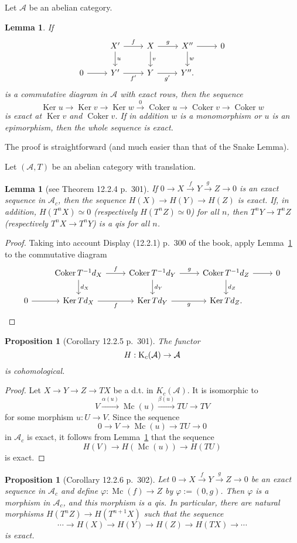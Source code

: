 \documentclass[12pt]{article}%
\newtheorem{lem}[thm]{Lemma}
\newtheorem{prop}[thm]{Proposition}
\theoremstyle{remark}
\theoremstyle{definition}
\newcommand{\A}{\mathcal A}
\newcommand{\pp}{\varphi}
\newcommand{\xr}{\xrightarrow}
\DeclareMathOperator{\Coker}{Coker}
\DeclareMathOperator{\Ker}{Ker}
\DeclareMathOperator{\Mc}{Mc}
\begin{document}
Let $\A$ be an abelian category. 

\begin{lem}\label{sl1}
If 
$$
\begin{tikzcd}
{}&X'\ar{d}{u}\ar{r}{f}&X\ar{d}{v}\ar{r}{g}&X''\ar{d}{w}\ar{r}&0\\ 
0\ar{r}&Y'\ar{r}[swap]{f'}&Y\ar{r}[swap]{g'}&Y''.
\end{tikzcd}
$$ 
is a commutative diagram in $\A$ with exact rows, then the sequence 
$$
\Ker u\to\Ker v\to\Ker w\xr0\Coker u\to\Coker v\to\Coker w
$$
is exact at $\Ker v$ and $\Coker v$. If in addition $w$ is a monomorphism or $u$ is an epimorphism, then the whole sequence is exact.
\end{lem}
%
The proof is straightforward (and much easier than that of the Snake Lemma). 

Let $(\A,T)$ be an abelian category with translation. 

\begin{lem}[see Theorem 12.2.4 p.~301]\label{sl2}
If $0\to X\xr fY\xr g Z\to0$ is an exact sequence in $\A_c$, then the sequence $H(X)\to H(Y)\to H(Z)$ is exact. If, in addition, $H(T^nX)\simeq0$ (respectively $H(T^nZ)\simeq0$) for all $n$, then $T^nY\to T^nZ$ (respectively $T^nX\to T^nY$) is a qis for all $n$. 
\end{lem}

\begin{proof}
Taking into account Display (12.2.1) p.~300 of the book, apply Lemma~\ref{sl1} to the commutative diagram 
$$
\begin{tikzcd}
{}&\Coker T^{-1}d_X\ar{d}{d_X}\ar{r}{f}&\Coker T^{-1}d_Y\ar{d}{d_Y}\ar{r}{g}&\Coker T^{-1}d_Z\ar{d}{d_Z}\ar{r}&0\\ 
0\ar{r}&\Ker Td_X\ar{r}[swap]{f}&\Ker Td_Y\ar{r}[swap]{g}&\Ker Td_Z.
\end{tikzcd}
$$ 
\end{proof}

\begin{prop}[Corollary 12.2.5 p.~301]\label{sl3}
The functor 
$$
H:\text K_c(\A)\to\A
$$ 
is cohomological.  
\end{prop}

\begin{proof}
Let $X\to Y\to Z\to TX$ be a d.t. in $K_c(\A)$. It is isomorphic to 
$$
V\xr{\alpha(u)}\Mc(u)\xr{\beta(u)}TU\to TV
$$ 
for some morphism $u:U\to V$. Since the sequence 
$$
0\to V\to\Mc(u)\to TU\to0
$$ 
in $\A_c$ is exact, it follows from Lemma~\ref{sl2} that the sequence 
$$ 
H(V)\to H(\Mc(u))\to H(TU)
$$ 
is exact.
\end{proof}
%
\begin{prop}[Corollary 12.2.6 p.~302]\label{sl4}
Let $0\to X\xr f Y\xr g Z\to0$ be an exact sequence in $\A_c$ and define $\pp:\Mc(f)\to Z$ by $\pp:=(0,g)$. Then $\pp$ is a morphism in $\A_c$, and this morphism is a qis. In particular, there are natural morphisms $H(T^nZ)\to H(T^{n+1}X)$ such that the sequence 
$$
\cdots\to H(X)\to H(Y)\to H(Z)\to H(TX)\to\cdots
$$
is exact. 
\end{prop}
\end{document}
